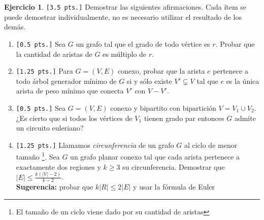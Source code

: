 \documentclass[a4paper,oneside,12pt]{amsart}
\theoremstyle{definition}
\newtheorem{quest}{Ejercicio}
\begin{document}
\begin{quest}\verb|[3.5 pts.]|
Demostrar las siguientes afirmaciones. Cada ítem se puede demostrar individualmente, no es necesario utilizar el
resultado de los demás.
\begin{enumerate}[label=\alph*)]
    \item \verb|[0.5 pts.]| Sea $G$ un grafo tal que el grado de todo vértice es $r$. Probar que la cantidad de
    aristas de $G$ es múltiplo de $r$.
    \item \verb|[1.25 pts.]| Para $G=(V,E)$ conexo, probar que la arista $e$ pertenece a todo árbol generador
    mínimo de $G$ si y sólo existe $V'\subsetneq V$ tal que $e$ es la única arista de peso mínimo que conecta $V'$
    con $V-V'$.
    \item \verb|[0.5 pts.]| Sea $G=(V,E)$ conexo y bipartito con bipartición $V=V_1\cup V_2$. ¿Es cierto que si
    todos los vértices de $V_1$ tienen grado par entonces $G$ admite un circuito euleriano?
    \item \verb|[1.25 pts.]| Llamamos \textit{circunferencia} de un grafo $G$ al ciclo de menor tamaño
    \footnote{El tamaño de un ciclo
    viene dado por su cantidad de aristas}. Sea $G$ un grafo planar conexo tal que cada arista pertenece a exactamente dos
    regiones y $k \geq 3$ su circunferencia. Demostrar que $|E|\leq \frac{k(|V|-2)}{k-2}$.\\
    \textbf{Sugerencia:} probar que $k|R| \leq 2|E|$ y usar la fórmula de Euler

\end{enumerate}
\end{quest}


\end{document}
